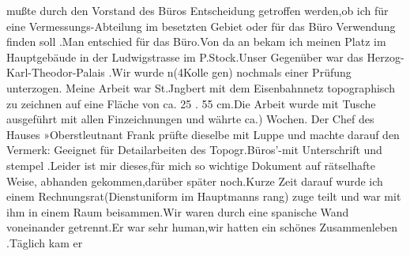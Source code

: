 \documentclass[a4paper,11pt]{article}
\begin{document}
mußte durch den Vorstand des Büros Entscheidung getroffen werden,ob ich für eine Vermessungs-Abteilung im besetzten Gebiet oder für das Büro Verwendung finden soll .Man entschied für das Büro.Von da an bekam ich meinen Platz im Hauptgebäude in der Ludwigstrasse im P.Stock.Unser Gegenüber war das Herzog-Karl-Theodor-Palais .Wir wurde n(4Kolle gen) nochmals einer Prüfung unterzogen. Meine Arbeit war St.Jngbert mit dem Eisenbahnnetz topographisch zu zeichnen auf eine Fläche von ca. 25 . 55 cm.Die Arbeit wurde mit Tusche ausgeführt mit allen Finzeichnungen und währte ca.) Wochen. Der Chef des Hauses »Oberstleutnant Frank prüfte dieselbe mit Luppe und machte darauf den Vermerk: Geeignet für Detailarbeiten des Topogr.Büros'-mit Unterschrift und stempel .Leider ist mir dieses,für mich so wichtige Dokument auf rätselhafte Weise, abhanden gekommen,darüber später noch.Kurze Zeit darauf wurde ich einem Rechnungsrat(Dienstuniform im Hauptmanns rang) zuge teilt und war mit ihm in einem Raum beisammen.Wir waren durch eine spanische Wand voneinander getrennt.Er war sehr human,wir hatten ein schönes Zusammenleben .Täglich kam er
\end{document}
